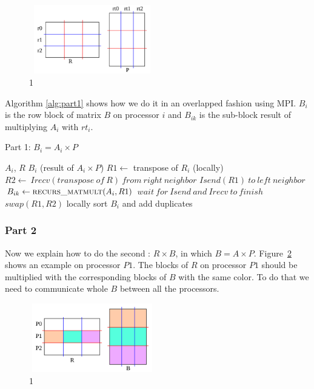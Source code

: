 \begin{figure}[tbh]
 \centering
 \includegraphics[width=5.5cm,height=3cm]{./figures/part1c.pdf}
 \caption{1}
 \label{fig:part1c}
\end{figure}

Algorithm \ref{alg:part1} shows how we do it in an overlapped fashion using MPI. $B_{i}$ is the row block of matrix $B$ on processor $i$ and $B_{ik}$ is the sub-block result of multiplying $A_i$ with $rt_i$.

\begin{algorithm}[H] 
  \caption{Part 1: $B_i = A_i \times P$} \label{alg:part1} 
  \begin{algorithmic}[1]
    \Require $A_i$, $R$
    \Ensure  $B_i$ (result of $A_i \times P$)
    \State $R1 \leftarrow$ transpose of $R_i$ (locally)
      \State $R2 \leftarrow\ Irecv(transpose\ of\ R)\ from\ right\ neighbor$
      \State $Isend(R1)\ to\ left\ neighbor$
      \State $B_{ik} \leftarrow \textsc{recurs\_matmult}(A_i, R1)$ 
      \State $wait\ for\ Isend\ and\ Irecv\ to\ finish$
      \State $swap(R1,R2)$
    \EndFor
    \State locally sort $B_i$ and add duplicates
  \end{algorithmic}
\end{algorithm}


\subsubsection{Part 2}

Now we explain how to do the second \mm: $R \times B$, in which $B = A \times P$. Figure~\ref{fig:part2d} shows an example on processor $P1$. The blocks of $R$ on processor $P1$ should be multiplied with the corresponding blocks of $B$ with the same color. To do that we need to communicate whole $B$ between all the processors.

\begin{figure}[tbh]
 \centering
 \includegraphics[width=5.5cm,height=3cm]{./figures/part2d.pdf}
 \caption{1}
 \label{fig:part2d}
\end{figure}

